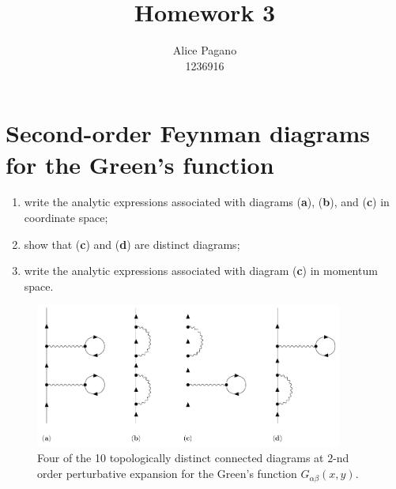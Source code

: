 \documentclass[11pt, a4paper, twoside, openright]{article}
\begin{document}
\title{\textbf{Homework 3}}

\author{Alice Pagano \\ 1236916}

\maketitle

\section*{Second-order Feynman diagrams for the Green’s function}
\begin{enumerate}
\item  write the analytic expressions associated with diagrams (\textbf{a}), (\textbf{b}), and (\textbf{c}) in coordinate space;
\item show that (\textbf{c}) and (\textbf{d}) are distinct diagrams;
\item write the analytic expressions associated with diagram (\textbf{c}) in momentum space.
\end{enumerate}



\begin{figure}[h!]
\centering
\includegraphics[width=0.9\textwidth]{images/tutti.pdf}
\caption{\label{fig:1} Four of the 10 topologically distinct connected diagrams at \( 2 \)-nd order perturbative expansion for the Green's function \( G_{\alpha \beta } (x,y) \).}
\end{figure}

\end{document}
